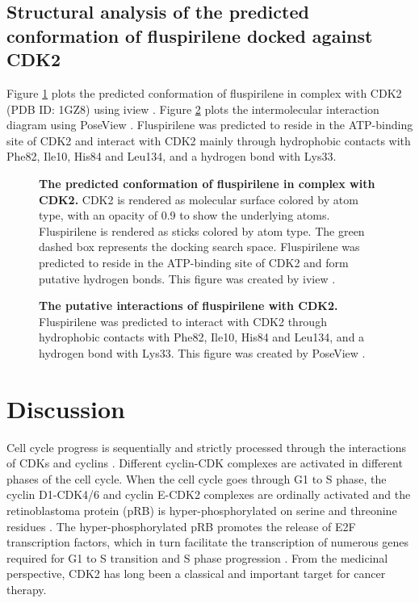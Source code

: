 \documentclass[10pt,letterpaper]{article}
\begin{document}
\subsection*{Structural analysis of the predicted conformation of fluspirilene docked against CDK2}

Figure \ref{1GZ8-ZINC00537755-ms} plots the predicted conformation of fluspirilene in complex with CDK2 (PDB ID: 1GZ8) using iview \cite{1366}. Figure \ref{1GZ8-ZINC00537755-pv} plots the intermolecular interaction diagram using PoseView \cite{748}. Fluspirilene was predicted to reside in the ATP-binding site of CDK2 and interact with CDK2 mainly through hydrophobic contacts with Phe82, Ile10, His84 and Leu134, and a hydrogen bond with Lys33.

\begin{figure}
\caption{{\bf The predicted conformation of fluspirilene in complex with CDK2.} CDK2 is rendered as molecular surface colored by atom type, with an opacity of 0.9 to show the underlying atoms. Fluspirilene is rendered as sticks colored by atom type. The green dashed box represents the docking search space. Fluspirilene was predicted to reside in the ATP-binding site of CDK2 and form putative hydrogen bonds. This figure was created by iview \cite{1366}.}
\label{1GZ8-ZINC00537755-ms}
\end{figure}

\begin{figure}
\caption{{\bf The putative interactions of fluspirilene with CDK2.} Fluspirilene was predicted to interact with CDK2 through hydrophobic contacts with Phe82, Ile10, His84 and Leu134, and a hydrogen bond with Lys33. This figure was created by PoseView \cite{748}.}
\label{1GZ8-ZINC00537755-pv}
\end{figure}

\section*{Discussion}

Cell cycle progress is sequentially and strictly processed through the interactions of CDKs and cyclins \cite{1612}. Different cyclin-CDK complexes are activated in different phases of the cell cycle. When the cell cycle goes through G1 to S phase, the cyclin D1-CDK4/6 and cyclin E-CDK2 complexes are ordinally activated and the retinoblastoma protein (pRB) is hyper-phosphorylated on serine and threonine residues \cite{1613}. The hyper-phosphorylated pRB promotes the release of E2F transcription factors, which in turn facilitate the transcription of numerous genes required for G1 to S transition and S phase progression \cite{1614}. From the medicinal perspective, CDK2 has long been a classical and important target for cancer therapy.
\end{document}
